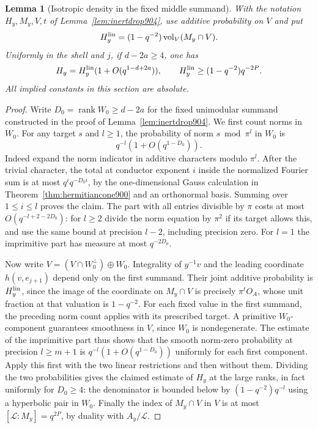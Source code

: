 \documentclass[a4paper,11pt]{article}
\newtheorem{lemma}[proposition]{Lemma}
\theoremstyle{definition}
\theoremstyle{remark}
\numberwithin{equation}{section}
\begin{document}
\begin{lemma}[Isotropic density in the fixed middle summand]
\leavevmode\label{lem:inertdensity905}
With the notation \(H_y,M_y,V,t\) of
Lemma~\ref{lem:inertdrop904}, use additive probability on \(V\)
and put
\[
      H_y^{\rm lin}=(1-q^{-2})\operatorname{vol}_{V}(M_y\cap V).
\]
Uniformly in the shell and \(j\), if \(d-2a\ge4\), one has
\[
  H_y=H_y^{\rm lin}(1+O(q^{1-d+2a})),\qquad
               H_y^{\rm lin}\ge (1-q^{-2})q^{-2P}.
\]
All implied constants in this section are absolute.
\end{lemma}
\begin{proof}
Write \(D_0=\operatorname{rank}W_0\ge d-2a\) for the fixed
unimodular summand constructed in the proof of
Lemma~\ref{lem:inertdrop904}. We first count norms in \(W_0\).
For any target \(s\) and \(l\ge1\), the probability of norm
\(s\bmod\pi^l\) in \(W_0\) is
\[
                         q^{-l}(1+O(q^{1-D_0})).
\]
Indeed expand the norm indicator in additive characters modulo
\(\pi^l\). After the trivial character, the total at conductor
exponent \(i\) inside the normalized Fourier sum is at most
\(q^i q^{-D_0i}\), by the one-dimensional Gauss calculation
in Theorem~\ref{thm:hermitiancone900} and an orthonormal basis.
Summing over \(1\le i\le l\) proves the claim. The part with
all entries divisible by \(\pi\) costs at most
\(O(q^{-l+2-2D_0})\): for \(l\ge2\) divide the norm equation
by \(\pi^2\) if its target allows this, and use the same bound
at precision \(l-2\), including precision zero. For \(l=1\)
the imprimitive part has measure at most \(q^{-2D_0}\).

Now write \(V=(V\cap W_0^\perp)\oplus W_0\). Integrality of
\(y^{-1}v\) and the leading coordinate \(h(v,e_{j+1})\) depend
only on the first summand. Their joint additive probability is
\(H_y^{\rm lin}\), since the image of the coordinate on \(M_y\cap V\)
is precisely \(\pi^tO_A\), whose unit fraction at that valuation
is \(1-q^{-2}\). For each fixed value in the first summand,
the preceding norm count applies with its prescribed target.
A primitive \(W_0\)-component guarantees smoothness in \(V\),
since \(W_0\) is nondegenerate. The estimate of the imprimitive
part thus shows that the smooth norm-zero probability at
precision \(l\ge m+1\) is \(q^{-l}(1+O(q^{1-D_0}))\)
uniformly for each first component. Apply this first with the
two linear restrictions and then without them. Dividing the
two probabilities gives the claimed estimate of \(H_y\) at the
large ranks, in fact uniformly for \(D_0\ge4\): the denominator
is bounded below by \((1-q^{-2})q^{-l}\) using a hyperbolic
pair in \(W_0\). Finally the index of \(M_y\cap V\) in \(V\)
is at most \([\mathcal L:M_y]=q^{2P}\), by duality with
\(A_y/\mathcal L\).
\end{proof}
\end{document}
